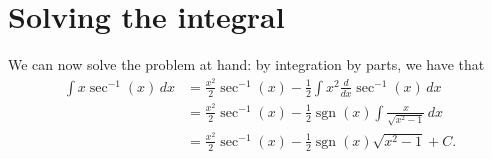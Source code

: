 \documentclass{article}
\DeclareMathOperator{\sgn}{sgn}
\begin{document}
\section{Solving the integral}

We can now solve the problem at hand: by integration by parts, we have that
\begin{align*}
    \int x \sec^{-1}(x) \, dx & = \frac{x^2}{2} \sec^{-1}(x) - \frac{1}{2} \int x^2 \frac{d}{dx} \sec^{-1}(x) \, dx \\
    & = \frac{x^2}{2} \sec^{-1}(x) - \frac{1}{2} \sgn(x) \int \frac{x}{\sqrt{x^2 - 1}} \, dx \\
    & = \frac{x^2}{2} \sec^{-1}(x) -  \frac{1}{2} \sgn(x) \sqrt{x^2 - 1} + C.
\end{align*}
\end{document}

